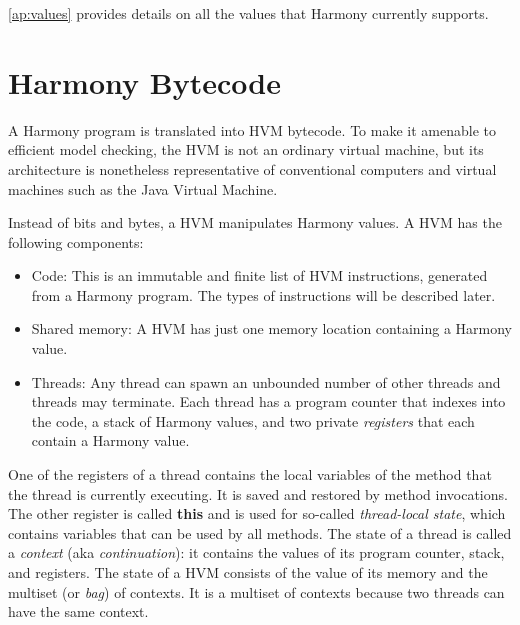 \documentclass{report}
\begin{document}
\autoref{ap:values} provides details on all the values that
Harmony currently supports.

\section*{Harmony Bytecode}

A Harmony program is translated into HVM bytecode.
To make it amenable to efficient model checking,
the HVM is not an ordinary virtual machine, but its architecture
is nonetheless representative of conventional computers and
virtual machines such as the Java Virtual Machine.

Instead of bits and bytes, a HVM manipulates Harmony values.
A HVM has the following components:
\begin{itemize}
\item Code:  This is an immutable and finite list of HVM instructions,
generated from a Harmony program.  The types of instructions will be described later.
\item Shared memory: A HVM has just one memory location containing
a Harmony value.
\item Threads:  Any thread
can spawn an unbounded number of other threads and threads may terminate.
Each thread has a program counter that indexes into the code,
%
a stack of Harmony values,
and two private \emph{registers} that each contain a Harmony value.
%
\end{itemize}

%
%
One of the registers of a thread contains the local variables of the
method that the thread is currently executing.  It is saved and restored by
method invocations.  The other register is called \textbf{this} and is
used for so-called \emph{thread-local state}, which contains variables that
can be used by all methods.
The state of a thread is called a \emph{context} (aka \emph{continuation}):
%
%
it contains the values of its program counter, stack, and registers.
The state of a HVM
consists of the value of its memory and the multiset (or \emph{bag})
%
%
of contexts.  It is a multiset of contexts because two threads can
have the same context.
\end{document}
